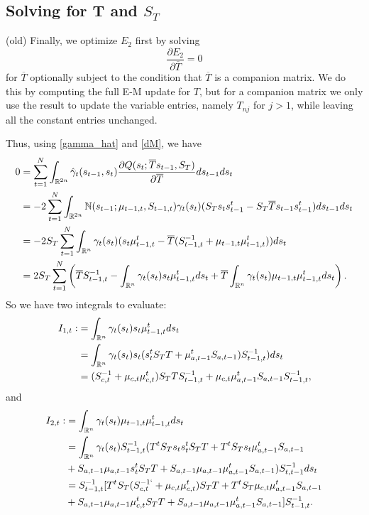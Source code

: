 \documentclass[12pt,leqno]{article}
\begin{document}
\subsection{Solving for T and $S_T$} (old)
Finally, we optimize $E_2$ first by solving
$$
\frac{\partial{E_2}}{\partial{\overline{T}}} = 0
$$
for $\overline{T}$ optionally subject to the condition that $\overline{T}$ is a companion matrix.  We do this
by computing the full E-M update for $T$, but for a companion matrix we only use the result to update the variable entries,
namely $T_{nj}$ for $j > 1$, while leaving all the constant entries unchanged.

Thus, using \eqref{gamma_hat} and \eqref{dM}, we have
\begin{equation}\label{T:1}
  \begin{split}
0 &= \sum_{t=1}^N\int_{{\mathbb R}^{2n}}\hat{\gamma}_t(s_{t-1},s_t)
\frac{\partial{Q(s_t;\overline{T}s_{t-1},S_T)}}{\partial\overline{T}}ds_{t-1}ds_t \\
&= -2\sum_{t=1}^N\int_{{\mathbb R}^{2n}}{\mathbb N}(s_{t-1};\mu_{t-1,t},S_{t-1,t})\gamma_t(s_t)(S_Ts_ts_{t-1}^t -
S_T\overline{T}s_{t-1}s_{t-1}^t) ds_{t-1}ds_t \\
&= -2S_T\sum_{t=1}^N\int_{{\mathbb R}^{n}}\gamma_t(s_t) (s_t\mu_{t-1,t}^t -
\overline{T}(S_{t-1,t}^{-1} + \mu_{t-1,t}\mu_{t-1,t}^t))ds_t \\
&= 2S_T\sum_{t=1}^N\left(\overline{T}S_{t-1,t}^{-1} - \int_{{\mathbb R}^n}\gamma_t(s_t)s_t\mu_{t-1,t}^tds_t +
\overline{T}\int_{{\mathbb R}^n}\gamma_t(s_t)\mu_{t-1,t}\mu_{t-1,t}^tds_t\right).\\
  \end{split}
\end{equation}
So we have two integrals to evaluate:
\begin{equation}\label{I_1}
  \begin{split}
  I_{1,t} :&= \int_{{\mathbb R}^n}\gamma_t(s_t)s_t\mu_{t-1,t}^tds_t \\
  &= \int_{{\mathbb R}^n}\gamma_t(s_t)s_t(s_t^tS_TT + \mu_{a,t-1}^tS_{a,t-1})S_{t-1,t}^{-1})ds_t \\
  &= (S_{c,t}^{-1} + \mu_{c,t}\mu_{c,t}^t)S_TTS_{t-1,t}^{-1} + \mu_{c,t}\mu_{a,t-1}^tS_{a,t-1}S_{t-1,t}^{-1},
  \end{split}
  \end{equation}
and
\begin{equation}\label{I_2}
  \begin{split}
  I_{2,t} :&= \int_{{\mathbb R}^n}\gamma_t(s_t)\mu_{t-1,t}\mu_{t-1,t}^tds_t \\
  &= \int_{{\mathbb R}^n}\gamma_t(s_t)S_{t-1,t}^{-1}(T^tS_Ts_ts_t^tS_TT + T^tS_Ts_t\mu_{a,t-1}^tS_{a,t-1} \\
  &+ S_{a,t-1}\mu_{a,t-1}s_t^tS_TT + S_{a,t-1}\mu_{a,t-1}\mu_{a,t-1}^tS_{a,t-1}) S_{t,t-1}^{-1}ds_t \\
  &= S_{t-1,t}^{-1}[T^tS_T(S_{c,t}^{-1`}+\mu_{c,t}\mu_{c,t}^t)S_TT + T^tS_T\mu_{c,t}\mu_{a,t-1}^tS_{a,t-1} \\
  &+ S_{a,t-1}\mu_{a,t-1}\mu_{c,t}^tS_TT + S_{a,t-1}\mu_{a,t-1}\mu_{a,t-1}^tS_{a,t-1}]S_{t-1,t}^{-1}. \\
\end{split}
\end{equation}
\end{document}
